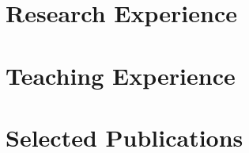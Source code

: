 \documentclass[margin,centered]{resVoyles}
\begin{document}
\begin{resume}
\section{\sc Research Experience}

% 



\section{\sc Teaching Experience}

% 



% 






\section{\sc Selected Publications}






\end{resume}
\end{document}

